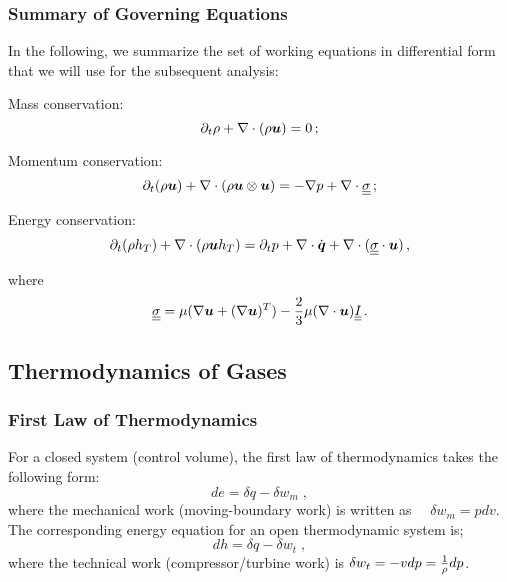 \subsubsection{Summary of Governing Equations}
In the following, we summarize the set of working equations in differential form that we will use for the subsequent analysis:
\begin{itemizePacked}
  \item Mass conservation: 
    \begin{equation}
      \partial_t \rho + \nabla \cdot (\rho {\mbox{\boldmath$u$}}) = 0\,;
    \end{equation}
  \item Momentum conservation: 
    \begin{equation}
      \partial_t (\rho {\mbox{\boldmath$u$}}) + \nabla \cdot (\rho {\mbox{\boldmath$u$}} \otimes {\mbox{\boldmath$u$}}) = - \nabla p + \nabla \cdot {\underline{\underline{{\sigma}}}}\,;
    \end{equation}
  \item Energy conservation: 
    \begin{equation}
      \partial_t (\rho h_T) + \nabla \cdot (\rho {\mbox{\boldmath$u$}} h_T) = \partial_t p + \nabla \cdot \dot{{\mbox{\boldmath$q$}}} + \nabla \cdot ({\underline{\underline{{\sigma}}}} \cdot {\mbox{\boldmath$u$}})\,,
    \end{equation}
\end{itemizePacked}
where
\begin{equation}
{\underline{\underline{{\sigma}}}} = \mu(\nabla {\mbox{\boldmath$u$}} + (\nabla {\mbox{\boldmath$u$}})^T) - \frac{2}{3} \mu (\nabla \cdot {\mbox{\boldmath$u$}}) {\underline{\underline{{I}}}}\,.
\end{equation}

\subsection{Thermodynamics of Gases}

\subsubsection{First Law of Thermodynamics}
For a closed system (control volume), the first law of thermodynamics takes the following form:
\begin{equation}
  d e = \delta q - \delta w_m\;,
\end{equation}
where the mechanical work (moving-boundary work) is written as $\quad \delta w_m = pdv$. The corresponding energy equation for an open thermodynamic system is;
\begin{equation}
  d h = \delta q - \delta w_t\;,
\end{equation}
where the technical work (compressor/turbine work) is  $\delta w_t =-vdp = 
{\frac{1}{\rho}}dp$.

